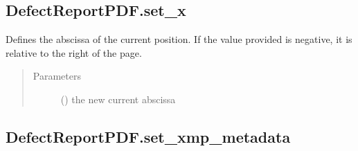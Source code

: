 \documentclass[letterpaper,10pt,english]{sphinxmanual}
\begin{document}
\begin{fulllineitems}
\begin{fulllineitems}
\begin{quote}
\begin{description}
\end{description}\end{quote}

\end{fulllineitems}



\subsection{DefectReportPDF.set\_x}
\label{\detokenize{generated/quality_assessment.quality_pdf_report.DefectReportPDF.set_x:defectreportpdf-set-x}}\label{\detokenize{generated/quality_assessment.quality_pdf_report.DefectReportPDF.set_x::doc}}

\begin{fulllineitems}
\label{\detokenize{generated/quality_assessment.quality_pdf_report.DefectReportPDF.set_x:quality_assessment.quality_pdf_report.DefectReportPDF.set_x}}
\sphinxAtStartPar
Defines the abscissa of the current position.
If the value provided is negative, it is relative to the right of the page.
\begin{quote}\begin{description}
\item[{Parameters}] \leavevmode
\sphinxAtStartPar
{} () \textendash{} the new current abscissa

\end{description}\end{quote}

\end{fulllineitems}



\subsection{DefectReportPDF.set\_xmp\_metadata}
\label{\detokenize{generated/quality_assessment.quality_pdf_report.DefectReportPDF.set_xmp_metadata:defectreportpdf-set-xmp-metadata}}\label{\detokenize{generated/quality_assessment.quality_pdf_report.DefectReportPDF.set_xmp_metadata::doc}}


\end{fulllineitems}
\end{document}
